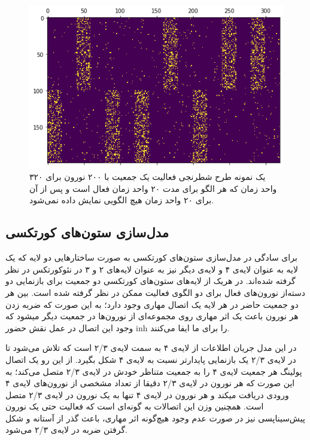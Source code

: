 \documentclass[12pt]{report}
\begin{document}
\begin{figure}[H]
	\centering
	\includegraphics[width=1.0\linewidth]{input-range.png}
	\caption[NS]{
		یک نمونه طرح شطرنجی فعالیت یک جمعیت با ۲۰۰ نورون برای ۳۲۰ واحد زمان که هر الگو برای مدت ۲۰ واحد زمان فعال است و پس از آن برای ۲۰ واحد زمان هیچ الگویی نمایش داده نمی‌شود.
	}
	\label{fig:input-range} 
\end{figure}
	
	\subsection{مدل‌سازی ستون‌های کورتکسی}
	
	برای سادگی در مدل‌سازی ستون‌های کورتکسی به صورت ساختارهایی دو لایه که یک لایه به عنوان لایه‌ی ۴ و لایه‌ی دیگر نیز به عنوان لایه‌‌های ۲ و ۳ در نئوکورتکس در نظر گرفته شده‌اند. در هریک از لایه‌های ستون‌های کورتکسی دو جمعیت برای بازنمایی دو دسته‌از نورون‌های فعال برای دو الگوی فعالیت ممکن در نظر گرفته شده است. بین هر دو جمعیت حاضر در هر لایه یک اتصال مهاری وجود دارد؛ به این صورت که ضربه زدن هر نورون باعث یک اثر مهاری روی مجموعه‌ای از نورون‌ها در جمعیت دیگر میشود که وجود این اتصال در عمل نقش حضور \gls{inh} را برای ما ایفا می‌کنند.
	
	در این مدل جریان اطلاعات از لایه‌ی ۴ به سمت لایه‌ی‌ ۲/۳ است که تلاش می‌شود تا در لایه‌ی ۲/۳ یک بازنمایی پایدار‌تر نسبت به لایه‌ی ۴ شکل بگیرد. از این رو یک اتصال پولینگ هر جمعیت لایه‌ی ۴ را به جمعیت متناظر خودش در لایه‌ی ۲/۳ متصل می‌کند؛ به این صورت که هر نورون در لایه‌ی ۲/۳ دقیقا از تعداد مشخصی از نورون‌های لایه‌ی ۴ ورودی دریافت میکند و هر نورون در لایه‌ی ۴ تنها به یک نورون در لایه‌ی ۲/۳ متصل است. همچنین وزن این اتصالات به گونه‌ای است که فعالیت حتی یک نورون پیش‌سیناپسی نیز در صورت عدم وجود هیچ‌گونه اثر مهاری، باعث گذر از آستانه و شکل گرفتن ضربه در لایه‌ی ۲/۳ می‌شود. 
	
\end{document}
